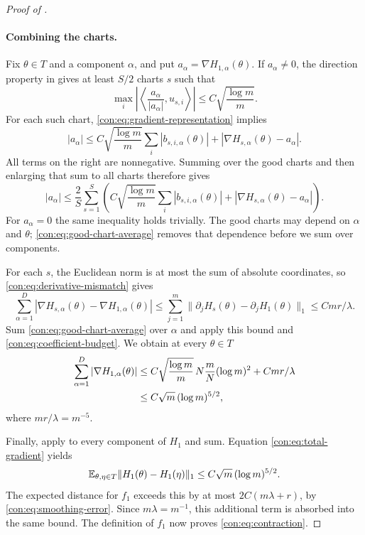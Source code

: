 \begin{proof}[Proof of ]
\paragraph{Combining the charts.}
Fix $\theta\in T$ and a component $\alpha$, and put
$a_\alpha=\nabla H_{1,\alpha}(\theta)$. If $a_\alpha\ne0$, the
direction property in  gives at least $S/2$ charts
$s$ such that
\[
  \max_i\left|\left\langle
       \frac{a_\alpha}{|a_\alpha|},u_{s,i}\right\rangle\right|
       \le C\sqrt{\frac{\log m}{m}}.
\]
For each such chart, \eqref{con:eq:gradient-representation} implies
\[
  |a_\alpha|
    \le C\sqrt{\frac{\log m}{m}}\sum_i|b_{s,i,\alpha}(\theta)|
       +|\nabla H_{s,\alpha}(\theta)-a_\alpha|.
\]
All terms on the right are nonnegative. Summing over the good charts and
then enlarging that sum to all charts therefore gives
\begin{equation}
  |a_\alpha|\le\frac{2}{S}\sum_{s=1}^S
       \left(
       C\sqrt{\frac{\log m}{m}}\sum_i|b_{s,i,\alpha}(\theta)|
       +|\nabla H_{s,\alpha}(\theta)-a_\alpha|
       \right).
  \label{con:eq:good-chart-average}
\end{equation}
For $a_\alpha=0$ the same inequality holds trivially. The good charts may
depend on $\alpha$ and $\theta$; \eqref{con:eq:good-chart-average} removes
that dependence before we sum over components.

For each $s$, the Euclidean norm is at most the sum of absolute
coordinates, so \eqref{con:eq:derivative-mismatch} gives
\[
  \sum_{\alpha=1}^D
       |\nabla H_{s,\alpha}(\theta)-\nabla H_{1,\alpha}(\theta)|
  \le\sum_{j=1}^m
       \|\partial_jH_s(\theta)-\partial_jH_1(\theta)\|_1
  \le Cmr/\lambda.
\]
Sum \eqref{con:eq:good-chart-average} over $\alpha$ and apply this bound
and \eqref{con:eq:coefficient-budget}. We obtain at every $\theta\in T$
\begin{align}
  \sum_{\alpha=1}^D|\nabla H_{1,\alpha}(\theta)|
   &\le C\sqrt{\frac{\log m}{m}}\,
          N\frac{m}{N}(\log m)^2+Cmr/\lambda\notag\\
   &\le C\sqrt m\,(\log m)^{5/2},
   \label{con:eq:total-gradient}
\end{align}
where $mr/\lambda=m^{-5}$.

Finally, apply  to every component of $H_1$ and sum.
Equation \eqref{con:eq:total-gradient} yields
\[
  \mathbb E_{\theta,\eta\in T}\|H_1(\theta)-H_1(\eta)\|_1
       \le C\sqrt m\,(\log m)^{5/2}.
\]
The expected distance for $f_1$ exceeds this by at most
$2C(m\lambda+r)$, by \eqref{con:eq:smoothing-error}. Since
$m\lambda=m^{-1}$, this additional term is absorbed into the same bound.
The definition of $f_1$ now proves \eqref{con:eq:contraction}.
\end{proof}
